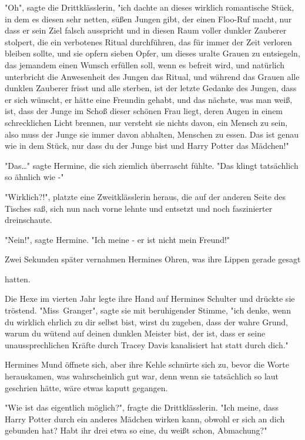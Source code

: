 {"Oh", sagte die Drittklässlerin, "ich dachte an dieses wirklich romantische Stück, in dem es diesen sehr netten, süßen Jungen gibt, der einen Floo-Ruf macht, nur dass er sein Ziel falsch ausspricht und in diesen Raum voller dunkler Zauberer stolpert, die ein verbotenes Ritual durchführen, das für immer der Zeit verloren bleiben sollte, und sie opfern sieben Opfer, um dieses uralte Grauen zu entsiegeln, das jemandem einen Wunsch erfüllen soll, wenn es befreit wird, und natürlich unterbricht die Anwesenheit des Jungen das Ritual, und während das Grauen alle dunklen Zauberer frisst und alle sterben, ist der letzte Gedanke des Jungen, dass er sich wünscht, er hätte eine Freundin gehabt, und das nächste, was man weiß, ist, dass der Junge im Schoß dieser schönen Frau liegt, deren Augen in einem schrecklichen Licht brennen, nur versteht sie nichts davon, ein Mensch zu sein, also muss der Junge sie immer davon abhalten, Menschen zu essen. Das ist genau wie in dem Stück, nur dass du der Junge bist und Harry Potter das Mädchen!"

"Das…" sagte Hermine, die sich ziemlich überrascht fühlte. "Das klingt tatsächlich so ähnlich wie -"

"Wirklich?!", platzte eine Zweitklässlerin heraus, die auf der anderen Seite des Tisches saß, sich nun nach vorne lehnte und entsetzt und noch faszinierter dreinschaute.

"Nein!", sagte Hermine. "Ich meine - er ist nicht mein Freund!"

Zwei Sekunden später vernahmen Hermines Ohren, was ihre Lippen gerade gesagt

hatten.

Die Hexe im vierten Jahr legte ihre Hand auf Hermines Schulter und drückte sie tröstend. "Miss~Granger", sagte sie mit beruhigender Stimme, "ich denke, wenn du wirklich ehrlich zu dir selbst bist, wirst du zugeben, dass der wahre Grund, warum du wütend auf deinen dunklen Meister bist, der ist, dass er seine unaussprechlichen Kräfte durch Tracey Davis kanalisiert hat statt durch dich."

Hermines Mund öffnete sich, aber ihre Kehle schnürte sich zu, bevor die Worte herauskamen, was wahrscheinlich gut war, denn wenn sie tatsächlich so laut geschrien hätte, wäre etwas kaputt gegangen.

"Wie ist das eigentlich möglich?", fragte die Drittklässlerin. "Ich meine, dass Harry Potter durch ein anderes Mädchen wirken kann, obwohl er sich an dich gebunden hat? Habt ihr drei etwa so eine, du weißt schon, Abmachung?"

}

